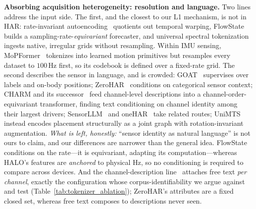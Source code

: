 \textbf{Absorbing acquisition heterogeneity: resolution and language.}
Two lines address the input side. The first, and the closest to our L1 mechanism, is not in HAR:
rate-invariant autoencoding~\cite{rateinvae} quotients out temporal warping,
FlowState~\cite{flowstate} builds a sampling-rate-\emph{equivariant} forecaster, and universal
spectral tokenization~\cite{spectraltok} ingests native, irregular grids without resampling.
Within IMU sensing, MoPFormer~\cite{mopformer} tokenizes into learned motion primitives but
resamples every dataset to $100$\,Hz first, so its codebook is defined over a fixed-rate grid.
The second describes the sensor in language, and is crowded: GOAT~\cite{goat} supervises over
labels and on-body positions; ZeroHAR~\cite{zerohar} conditions on categorical sensor context;
CHARM and its successor~\cite{charm,sensorsvoice} feed channel-level descriptions into a
channel-order-equivariant transformer, finding text conditioning on channel identity among their
largest drivers; SensorLLM~\cite{sensorllm} and oneHAR~\cite{onehar} take related routes;
UniMTS~\cite{unimts} instead encodes placement structurally as a joint graph with
rotation-invariant augmentation. \emph{What is left, honestly:} ``sensor identity as natural
language'' is not ours to claim, and our differences are narrower than the general idea. FlowState
conditions on the rate---it is equivariant, adapting its computation---whereas HALO's features
are \emph{anchored} to physical Hz, so no conditioning is required to compare across devices. And
the channel-description line~\cite{charm,sensorsvoice,sensorllm} attaches free text \emph{per
channel}, exactly the configuration whose corpus-identifiability we argue against and test
(Table~\ref{tab:tokenizer_ablation}); ZeroHAR's attributes are a fixed closed set, whereas free
text composes to descriptions never seen.

